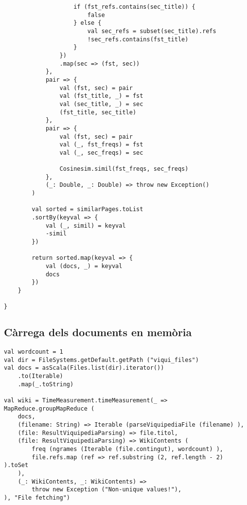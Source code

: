 \documentclass{article}
\begin{document}
\begin{lstlisting}
					if (fst_refs.contains(sec_title)) {
						false
					} else {
						val sec_refs = subset(sec_title).refs
						!sec_refs.contains(fst_title)
					}
				})
				.map(sec => (fst, sec))
			},
			pair => {
				val (fst, sec) = pair
				val (fst_title, _) = fst
				val (sec_title, _) = sec
				(fst_title, sec_title)
			},
			pair => {
				val (fst, sec) = pair
				val (_, fst_freqs) = fst
				val (_, sec_freqs) = sec

				Cosinesim.simil(fst_freqs, sec_freqs)
			},
			(_: Double, _: Double) => throw new Exception()
		)

		val sorted = similarPages.toList
		.sortBy(keyval => {
			val (_, simil) = keyval
			-simil
		})

		return sorted.map(keyval => {
			val (docs, _) = keyval
			docs
		})
	}

}
\end{lstlisting}

\subsection{Càrrega dels documents en memòria}

\begin{lstlisting}
val wordcount = 1
val dir = FileSystems.getDefault.getPath ("viqui_files")
val docs = asScala(Files.list(dir).iterator())
	.to(Iterable)
	.map(_.toString)

val wiki = TimeMeasurement.timeMeasurement(_ => MapReduce.groupMapReduce (
	docs,
	(filename: String) => Iterable (parseViquipediaFile (filename) ),
	(file: ResultViquipediaParsing) => file.titol,
	(file: ResultViquipediaParsing) => WikiContents (
		freq (ngrames (Iterable (file.contingut), wordcount) ),
		file.refs.map (ref => ref.substring (2, ref.length - 2) ).toSet
	),
	(_: WikiContents, _: WikiContents) =>
		throw new Exception ("Non-unique values!"),
), "File fetching")
\end{lstlisting}
\end{document}
